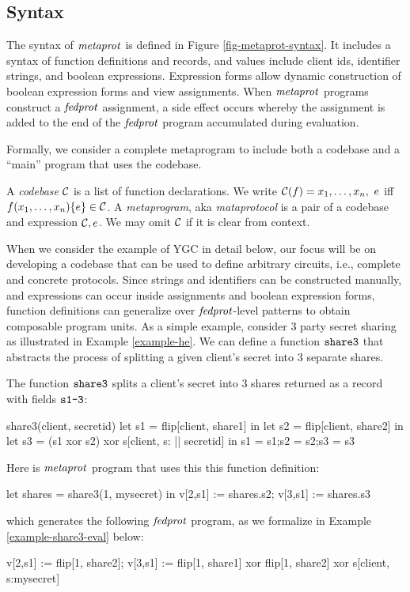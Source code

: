 \subsection{Syntax}

The syntax of $\mathit{metaprot}$ is defined in Figure
\ref{fig-metaprot-syntax}.  It includes a syntax of function
definitions and records, and values include client ids, identifier
strings, and boolean expressions. Expression forms allow dynamic
construction of boolean expression forms and view assignments. When
$\mathit{metaprot}$ programs construct a $\mathit{fedprot}$ assignment, a side effect
occurs whereby the assignment is added to the end of the $\mathit{fedprot}$
program accumulated during evaluation.

Formally, we consider a complete metaprogram to include both a
codebase and a ``main'' program that uses the codebase. 
\begin{definition}
A \emph{codebase} $\mathcal{C}$ is a list of function 
declarations. We write $ \mathcal{C}(f) = x_1,\ldots,x_n,\ e$
iff $f(x_1,\ldots,x_n) \{ e \} \in \mathcal{C}$.
A \emph{metaprogram}, aka \emph{mataprotocol} is a pair of a 
codebase and expression $\mathcal{C}, e$. We may omit
$\mathcal{C}$ if it is clear from context.  
\end{definition}

When we consider the example of YGC in detail below, our focus will be
on developing a codebase that can be used to define arbitrary
circuits, i.e., complete and concrete protocols. Since strings and
identifiers can be constructed manually, and expressions can occur
inside assignments and boolean expression forms, function definitions
can generalize over $\mathit{fedprot}$-level patterns to obtain composable
program units. As a simple example, consider 3 party secret
sharing as illustrated in Example \ref{example-he}. We can
define a function $\texttt{share3}$ that abstracts the process
of splitting a given client's secret into 3 separate shares.
\begin{example} \label{example-share3} The function $\texttt{share3}$ 
  splits a client's secret into 3 shares returned as a record
  with fields $\texttt{s1-3}$:
  \begin{verbatimtab}
    share3(client, secretid)
    {
      let s1 = flip[client, share1] in
      let s2 = flip[client, share2] in
      let s3 = (s1 xor s2) xor s[client, s: || secretid] in
      {s1 = s1;s2 = s2;s3 = s3}
    } \end{verbatimtab}
  Here is $\mathit{metaprot}$ program that uses this this function definition:
  \begin{verbatimtab}
    let shares = share3(1, mysecret) in
    v[2,s1] := shares.s2;
    v[3,s1] := shares.s3 \end{verbatimtab}
  which generates the following $\mathit{fedprot}$ program, as we formalize in Example \ref{example-share3-eval}
  below:
  \begin{verbatimtab}
    v[2,s1] := flip[1, share2];
    v[3,s1] := flip[1, share1] xor flip[1, share2] xor s[client, s:mysecret] \end{verbatimtab}
\end{example}

